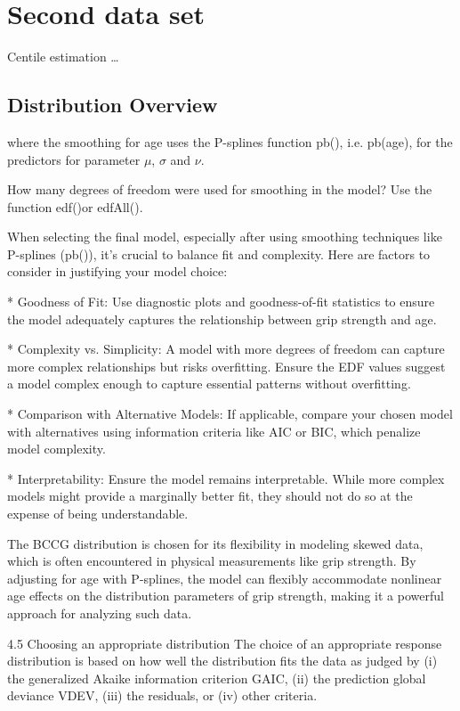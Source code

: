 \section{Second data set}

Centile estimation \ldots

\subsection{Distribution Overview}

where the smoothing for age uses the P-splines function pb(), i.e. pb(age), for the predictors for parameter $\mu$, $\sigma$ and $\nu$.

How many degrees of freedom were used for smoothing in the model? Use the function edf()or edfAll().

When selecting the final model, especially after using smoothing techniques like P-splines (pb()), it's crucial to balance fit and complexity. Here are factors to consider in justifying your model choice:

*    Goodness of Fit: Use diagnostic plots and goodness-of-fit statistics to ensure the model adequately captures the relationship between grip strength and age.

*    Complexity vs. Simplicity: A model with more degrees of freedom can capture more complex relationships but risks overfitting. Ensure the EDF values suggest a model complex enough to capture essential patterns without overfitting.

*    Comparison with Alternative Models: If applicable, compare your chosen model with alternatives using information criteria like AIC or BIC, which penalize model complexity.

*    Interpretability: Ensure the model remains interpretable. While more complex models might provide a marginally better fit, they should not do so at the expense of being understandable.

The BCCG distribution is chosen for its flexibility in modeling skewed data, which is often encountered in physical measurements like grip strength. By adjusting for age with P-splines, the model can flexibly accommodate nonlinear age effects on the distribution parameters of grip strength, making it a powerful approach for analyzing such data.

4.5 Choosing an appropriate distribution
The choice of an appropriate response distribution is based on how well the distribution
fits the data as judged by (i) the generalized Akaike information criterion GAIC, (ii)
the prediction global deviance VDEV, (iii) the residuals, or (iv) other criteria.

